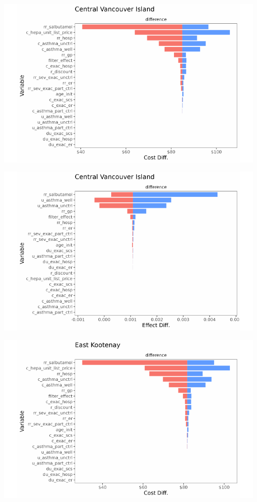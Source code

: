 \documentclass[
  number]{elsarticle}
\begin{document}
\includegraphics{index_files/figure-pdf/unnamed-chunk-9-1.pdf}

\includegraphics{index_files/figure-pdf/unnamed-chunk-9-2.pdf}

\includegraphics{index_files/figure-pdf/unnamed-chunk-9-3.pdf}
\end{document}
